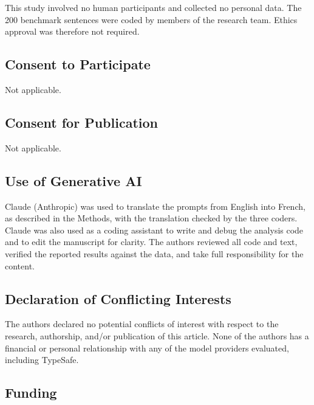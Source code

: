 \documentclass[
  man,
  floatsintext,
  longtable,
  nolmodern,
  notxfonts,
  notimes,
  colorlinks=true,linkcolor=blue,citecolor=blue,urlcolor=blue]{apa7}
\begin{document}
This study involved no human participants and collected no personal
data. The 200 benchmark sentences were coded by members of the research
team. Ethics approval was therefore not required.

\subsection*{Consent to Participate}\label{consent-to-participate}

Not applicable.

\subsection*{Consent for Publication}\label{consent-for-publication}

Not applicable.

\subsection*{Use of Generative AI}\label{use-of-generative-ai}

Claude (Anthropic) was used to translate the prompts from English into
French, as described in the Methods, with the translation checked by the
three coders. Claude was also used as a coding assistant to write and
debug the analysis code and to edit the manuscript for clarity. The
authors reviewed all code and text, verified the reported results
against the data, and take full responsibility for the content.

\subsection*{Declaration of Conflicting
Interests}\label{declaration-of-conflicting-interests}

The authors declared no potential conflicts of interest with respect to
the research, authorship, and/or publication of this article. None of
the authors has a financial or personal relationship with any of the
model providers evaluated, including TypeSafe.

\subsection*{Funding}\label{funding}
\end{document}
